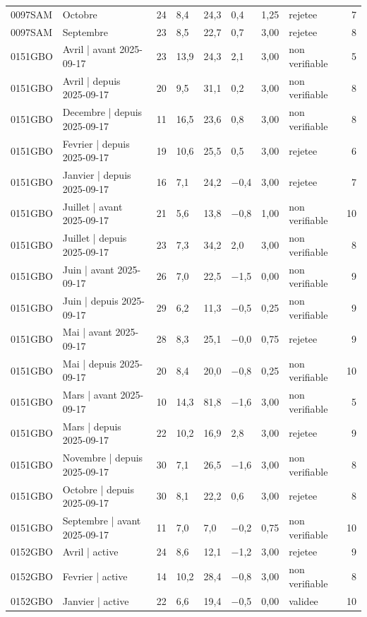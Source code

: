 \begin{table}[htbp]
\begin{tabular}{llrlllllr}
0097SAM & Octobre & 24 & 8,4 & 24,3 & 0,4 & 1,25 & rejetee & 7 \\
0097SAM & Septembre & 23 & 8,5 & 22,7 & 0,7 & 3,00 & rejetee & 8 \\
0151GBO & Avril | avant 2025-09-17 & 23 & 13,9 & 24,3 & 2,1 & 3,00 & non verifiable & 5 \\
0151GBO & Avril | depuis 2025-09-17 & 20 & 9,5 & 31,1 & 0,2 & 3,00 & non verifiable & 8 \\
0151GBO & Decembre | depuis 2025-09-17 & 11 & 16,5 & 23,6 & 0,8 & 3,00 & non verifiable & 8 \\
0151GBO & Fevrier | depuis 2025-09-17 & 19 & 10,6 & 25,5 & 0,5 & 3,00 & rejetee & 6 \\
0151GBO & Janvier | depuis 2025-09-17 & 16 & 7,1 & 24,2 & −0,4 & 3,00 & rejetee & 7 \\
0151GBO & Juillet | avant 2025-09-17 & 21 & 5,6 & 13,8 & −0,8 & 1,00 & non verifiable & 10 \\
0151GBO & Juillet | depuis 2025-09-17 & 23 & 7,3 & 34,2 & 2,0 & 3,00 & non verifiable & 8 \\
0151GBO & Juin | avant 2025-09-17 & 26 & 7,0 & 22,5 & −1,5 & 0,00 & non verifiable & 9 \\
0151GBO & Juin | depuis 2025-09-17 & 29 & 6,2 & 11,3 & −0,5 & 0,25 & non verifiable & 9 \\
0151GBO & Mai | avant 2025-09-17 & 28 & 8,3 & 25,1 & −0,0 & 0,75 & rejetee & 9 \\
0151GBO & Mai | depuis 2025-09-17 & 20 & 8,4 & 20,0 & −0,8 & 0,25 & non verifiable & 10 \\
0151GBO & Mars | avant 2025-09-17 & 10 & 14,3 & 81,8 & −1,6 & 3,00 & non verifiable & 5 \\
0151GBO & Mars | depuis 2025-09-17 & 22 & 10,2 & 16,9 & 2,8 & 3,00 & rejetee & 9 \\
0151GBO & Novembre | depuis 2025-09-17 & 30 & 7,1 & 26,5 & −1,6 & 3,00 & non verifiable & 8 \\
0151GBO & Octobre | depuis 2025-09-17 & 30 & 8,1 & 22,2 & 0,6 & 3,00 & rejetee & 8 \\
0151GBO & Septembre | avant 2025-09-17 & 11 & 7,0 & 7,0 & −0,2 & 0,75 & non verifiable & 10 \\
0152GBO & Avril | active & 24 & 8,6 & 12,1 & −1,2 & 3,00 & rejetee & 9 \\
0152GBO & Fevrier | active & 14 & 10,2 & 28,4 & −0,8 & 3,00 & non verifiable & 8 \\
0152GBO & Janvier | active & 22 & 6,6 & 19,4 & −0,5 & 0,00 & validee & 10 \\

\end{tabular}
\end{table}
